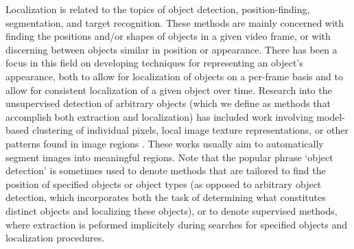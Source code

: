 \documentclass[smallcondensed, final]{svjour3}
\begin{document}
Localization is related to the topics of object detection, position-finding, segmentation, and target recognition. These methods are mainly concerned with finding the positions and/or shapes of objects in a given video frame, or with discerning between objects similar in position or appearance. There has been a focus in this field on developing techniques for representing an object's appearance, both to allow for localization of objects on a per-frame basis and to allow for consistent localization of a given object over time. Research into the unsupervised detection of arbitrary objects (which we define as methods that accomplish both extraction and localization) has included work involving model-based clustering of individual pixels, local image texture representations, or other patterns found in image regions \cite{jain1997object, fei2005bayesian, sivic2005discovering}. These works usually aim to automatically segment images into meaningful regions. Note that the popular phrase `object detection' is sometimes used to denote methods that are tailored to find the position of specified objects or object types (as opposed to arbitrary object detection, which incorporates both the task of determining what constitutes distinct objects and localizing these objects), or to denote supervised methods, where extraction is peformed implicitely during searches for specified objects and localization procedures.
\end{document}
